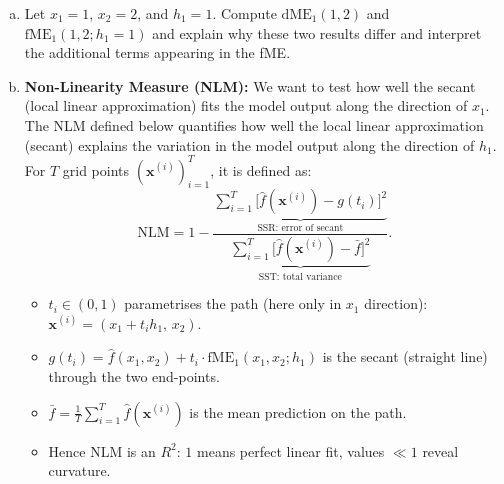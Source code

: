 {\begin{enumerate}[a)]
  \item Let \( x_1 = 1 \), \( x_2 = 2 \), and \( h_1 = 1 \). Compute \( \text{dME}_1(1, 2) \) and \( \text{fME}_1(1, 2; h_1 = 1) \) and explain why these two results differ and interpret the additional terms appearing in the fME.
% 
  \item \textbf{Non-Linearity Measure (NLM):} We want to test how well the secant (local linear approximation) fits the model output along the direction of $x_1$. The NLM defined below quantifies how well the local linear approximation (secant) explains the variation in the model output along the direction of $h_1$. For $T$ grid points $(\mathbf x^{(i)})_{i=1}^{T}$, it is defined as:
\[
  \mathrm{NLM}
  = 1 -
    \frac{\displaystyle
          \underbrace{\sum_{i=1}^{T}
            \bigl[\hat f(\mathbf x^{(i)})-g(t_i)\bigr]^2}_{\text{SSR: error of secant}}}
         {\displaystyle
          \underbrace{\sum_{i=1}^{T}
            \bigl[\hat f(\mathbf x^{(i)})-\bar f\bigr]^2}_{\text{SST: total variance}}}.
\]
\begin{itemize}\setlength\itemsep{0.2em}
  \item $\displaystyle t_i \in (0,1)$ param\-e\-tri\-ses the path (here only in $x_1$ direction):
        \(\mathbf x^{(i)} = (x_1 + t_i h_1,\,x_2)\).
  \item $\displaystyle g(t_i)
        = \hat f(x_1,x_2)
        + t_i\cdot\text{fME}_1(x_1,x_2;h_1)$  
        is the secant (straight line) through the two end-points.
  \item $\displaystyle\bar f
        = \frac1T \sum_{i=1}^{T}\hat f(\mathbf x^{(i)})$
        is the mean prediction on the path.
  \item Hence NLM is an $R^{2}$: $1$ means perfect linear fit,
        values $\ll 1$ reveal curvature.
\end{itemize}


\end{enumerate}}
